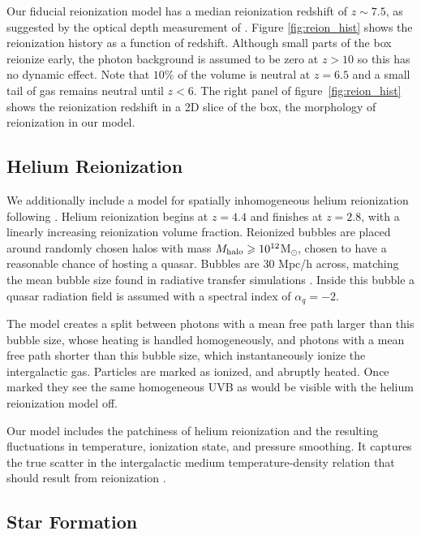 \documentclass[fleqn,usenatbib]{mnras}
\begin{document}
Our fiducial reionization model has a median reionization redshift of $z \sim 7.5$, as suggested by the optical depth measurement of \cite{Planck}. Figure \ref{fig:reion_hist} shows the reionization history as a function of redshift. Although small parts of the box reionize early, the photon background is assumed to be zero at $z>10$ so this has no dynamic effect. Note that $10\%$ of the volume is neutral at $z=6.5$ and a small tail of gas remains neutral until $z < 6$. The right panel of figure~\ref{fig:reion_hist} shows the reionization redshift in a 2D slice of the box, the morphology of reionization in our model.

\subsection{Helium Reionization}
\label{sec:helium}

We additionally include a model for spatially inhomogeneous helium reionization following \cite{2020MNRAS.496.4372U}. Helium reionization begins at $z=4.4$ and finishes at $z=2.8$, with a linearly increasing reionization volume fraction. Reionized bubbles are placed around randomly chosen halos with mass $M_{\rm halo}\geq10^{12}$M$_{\odot}$, chosen to have a reasonable chance of hosting a quasar. Bubbles are $30$ Mpc/h across, matching the mean bubble size found in radiative transfer simulations \citep{2009ApJ...694..842M}. Inside this bubble a quasar radiation field is assumed with a spectral index of $\alpha_q = -2$.

The model creates a split between photons with a mean free path larger than this bubble size, whose heating is handled homogeneously, and photons with a mean free path shorter than this bubble size, which instantaneously ionize the intergalactic gas. Particles are marked as ionized, and abruptly heated. Once marked they see the same homogeneous UVB as would be visible with the helium reionization model off.

Our model includes the patchiness of helium reionization and the resulting fluctuations in temperature, ionization state, and pressure smoothing. It captures the true scatter in the intergalactic medium temperature-density relation that should result from  reionization \citep{2020MNRAS.496.4372U}.

\subsection{Star Formation}
\end{document}
